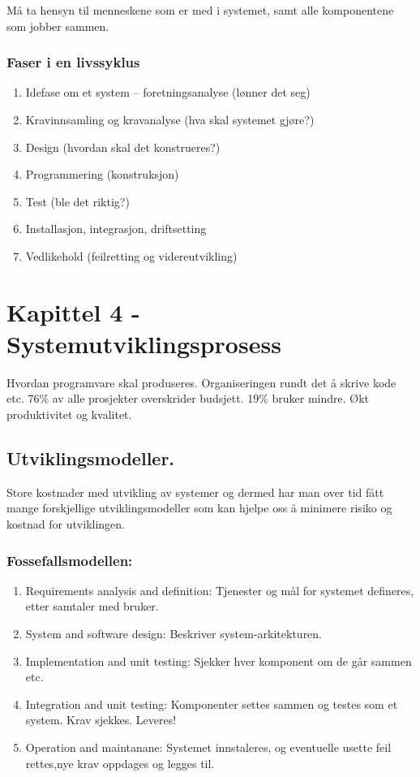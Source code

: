 \documentclass[11pt]{article}
\begin{document}
   Må ta hensyn til menneskene som er med i systemet, samt alle komponentene som jobber sammen.
\subsubsection{Faser i en livssyklus}
\label{sec-4.1}


\begin{enumerate}
\item Idefase om et system – foretningsanalyse (lønner det seg)
\item Kravinnsamling og kravanalyse (hva skal systemet gjøre?)
\item Design (hvordan skal det konstrueres?)
\item Programmering (konstruksjon)
\item Test (ble det riktig?)
\item Installasjon, integrasjon, driftsetting
\item Vedlikehold (feilretting og videreutvikling)
\end{enumerate}
\section{Kapittel 4 - Systemutviklingsprosess}
\label{sec-4}

  Hvordan programvare skal produseres. Organiseringen rundt det å skrive kode etc.
  76\% av alle prosjekter overskrider budsjett. 19\% bruker mindre.
  Økt produktivitet og kvalitet.
\subsection{Utviklingsmodeller.}
\label{sec-4.1}

     
   Store kostnader med utvikling av systemer og dermed har man over
   tid fått mange forskjellige utviklingsmodeller som kan hjelpe oss
   å minimere risiko og kostnad for utviklingen.
\subsubsection{Fossefallsmodellen:}
\label{sec-4.1.1}

\begin{enumerate}
\item Requirements analysis and definition: 
      Tjenester og mål for systemet defineres, etter samtaler med bruker.
\item System and software design: 
      Beskriver system-arkitekturen.
\item Implementation and unit testing: 
      Sjekker hver komponent om de går sammen etc.
\item Integration and unit testing: 
      Komponenter settes sammen og testes som et system. Krav sjekkes. Leveres!
\item Operation and maintanane: 
      Systemet innstaleres, og eventuelle usette feil rettes,nye krav oppdages og legges til.
\end{enumerate}
\end{document}
